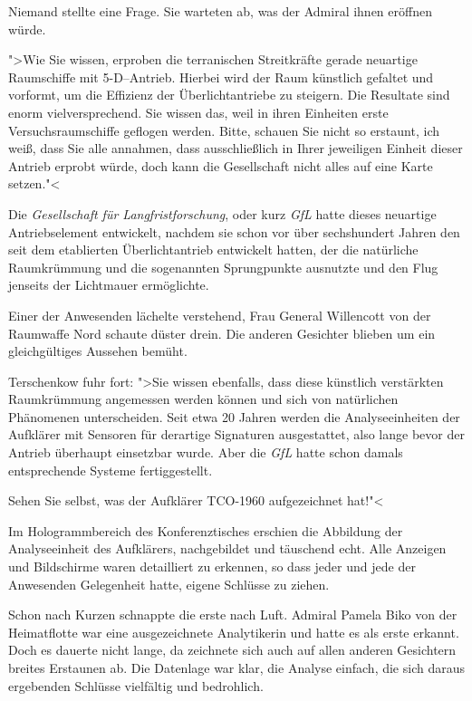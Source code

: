 \documentclass[11pt,twoside,openany]{scrbook}
\begin{document}
Niemand stellte eine Frage. Sie warteten ab, was der Admiral ihnen eröffnen würde.

">Wie Sie wissen, erproben die terranischen Streitkräfte gerade neuartige Raumschiffe mit 5-D--Antrieb. Hierbei wird der Raum künstlich gefaltet und vorformt, um die Effizienz der Überlichtantriebe zu steigern. Die Resultate sind enorm vielversprechend. Sie wissen das, weil in ihren Einheiten erste Versuchsraumschiffe geflogen werden. Bitte, schauen Sie nicht so erstaunt, ich weiß, dass Sie alle annahmen, dass ausschließlich in Ihrer jeweiligen Einheit dieser Antrieb erprobt würde, doch kann die Gesellschaft nicht alles auf eine Karte setzen."<

Die \emph{Gesellschaft für Langfristforschung}, oder kurz \emph{GfL} hatte dieses neuartige Antriebselement entwickelt, nachdem sie schon vor über sechshundert Jahren den seit dem etablierten Überlichtantrieb entwickelt hatten, der die natürliche Raumkrümmung und die sogenannten Sprungpunkte ausnutzte und den Flug jenseits der Lichtmauer ermöglichte.

Einer der Anwesenden lächelte verstehend, Frau General Willencott von der Raumwaffe Nord schaute düster drein. Die anderen Gesichter blieben um ein gleichgültiges Aussehen bemüht.

Terschenkow fuhr fort: ">Sie wissen ebenfalls, dass diese künstlich verstärkten Raumkrümmung angemessen werden können und sich von natürlichen Phänomenen unterscheiden. Seit etwa 20 Jahren werden die Analyseeinheiten der Aufklärer mit Sensoren für derartige Signaturen ausgestattet, also lange bevor der Antrieb überhaupt einsetzbar wurde. Aber die \emph{GfL} hatte schon damals entsprechende Systeme fertiggestellt.

Sehen Sie selbst, was der Aufklärer \textsf{TCO-1960} aufgezeichnet hat!"<

Im Hologrammbereich des Konferenztisches erschien die Abbildung der Analyseeinheit des Aufklärers, nachgebildet und täuschend echt. Alle Anzeigen und Bildschirme waren detailliert zu erkennen, so dass jeder und jede der Anwesenden Gelegenheit hatte, eigene Schlüsse zu ziehen.

Schon nach Kurzen schnappte die erste nach Luft. Admiral Pamela Biko von der Heimatflotte war eine ausgezeichnete Analytikerin und hatte es als erste erkannt. Doch es dauerte nicht lange, da zeichnete sich auch auf allen anderen Gesichtern breites Erstaunen ab. Die Datenlage war klar, die Analyse einfach, die sich daraus ergebenden Schlüsse vielfältig und bedrohlich.
\end{document}
